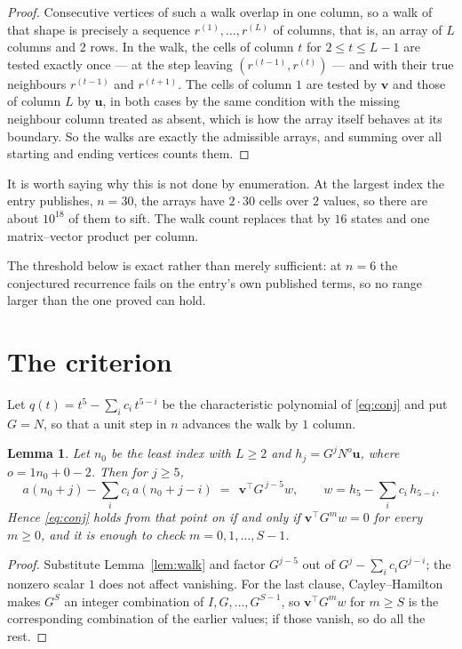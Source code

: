 \documentclass[11pt,a4paper]{article}
\theoremstyle{plain}
\newtheorem{lemma}[theorem]{Lemma}
\theoremstyle{definition}
\begin{document}
\begin{proof}
Consecutive vertices of such a walk overlap in one column, so a walk of that shape is
precisely a sequence $r^{(1)},\dots,r^{(L)}$ of columns, that is, an array of $L$ columns
and $2$ rows. In the walk, the cells of column $t$ for $2\le t\le L-1$ are tested
exactly once --- at the step leaving $(r^{(t-1)},r^{(t)})$ --- and with their true
neighbours $r^{(t-1)}$ and $r^{(t+1)}$. The cells of column $1$ are tested by
$\mathbf{v}$ and those of column $L$ by $\mathbf{u}$, in both cases by the same condition
with the missing neighbour column treated as absent, which is how the array itself behaves at
its boundary. So the walks are exactly the admissible arrays, and summing over all starting
and ending vertices counts them.
\end{proof}


It is worth saying why this is not done by enumeration. At the largest index the entry
publishes, $n=30$, the arrays have $2\cdot30$ cells over
$2$ values, so there are about $10^{18}$ of them to sift. The
walk count replaces that by $16$ states and one matrix--vector product per column.

The threshold below is exact rather than merely sufficient: at $n=6$ the conjectured
recurrence fails on the entry's own published terms, so no range larger than the one proved
can hold.
\section{The criterion}

Let $q(t)=t^{5}-\sum_i c_i\,t^{5-i}$ be the characteristic polynomial of
\eqref{eq:conj} and put $G=N$, so that a unit step in $n$ advances the walk by
$1$ column.

\begin{lemma}\label{lem:crit}
Let $n_0$ be the least index with $L\ge2$ and $h_j=G^{j}N^{o}\mathbf{u}$, where
$o=1n_0+0-2$. Then for $j\ge5$,
\[
a(n_0+j)-\sum_i c_i\,a(n_0+j-i)\;=\;\,\mathbf{v}^{\!\top}G^{\,j-5}w,
\qquad w=h_{5}-\sum_i c_i\,h_{5-i} .
\]
Hence \eqref{eq:conj} holds from that point on if and only if
$\mathbf{v}^{\!\top}G^{m}w=0$ for every $m\ge0$, and it is enough to check
$m=0,1,\dots,S-1$.
\end{lemma}

\begin{proof}
Substitute Lemma~\ref{lem:walk} and factor $G^{j-5}$ out of
$G^{j}-\sum_ic_iG^{j-i}$; the nonzero scalar $1$ does not affect
vanishing. For the last clause, Cayley--Hamilton makes $G^{S}$ an integer combination of
$I,G,\dots,G^{S-1}$, so $\mathbf{v}^{\!\top}G^{m}w$ for $m\ge S$ is the corresponding
combination of the earlier values; if those vanish, so do all the rest.
\end{proof}
\end{document}
